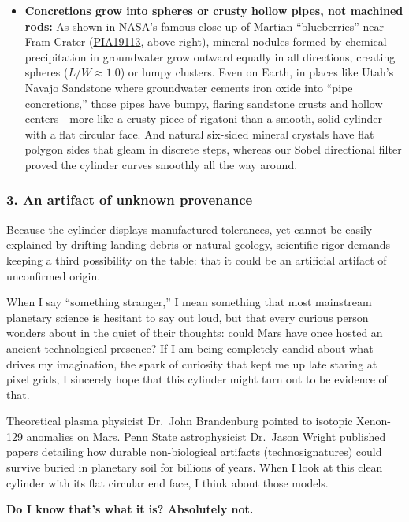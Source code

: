 \documentclass[11pt,a4paper]{article}
\begin{document}
\begin{itemize}
\begin{enumerate}
	      \end{enumerate}
	\item \textbf{Concretions grow into spheres or crusty hollow pipes, not machined rods:} As shown in NASA's famous close-up of Martian ``blueberries'' near Fram Crater (\href{https://science.nasa.gov/photojournal/martian-concretions-near-fram-crater/}{PIA19113}, above right), mineral nodules formed by chemical precipitation in groundwater grow outward equally in all directions, creating spheres ($L/W \approx 1.0$) or lumpy clusters. Even on Earth, in places like Utah's Navajo Sandstone where groundwater cements iron oxide into ``pipe concretions,'' those pipes have bumpy, flaring sandstone crusts and hollow centers---more like a crusty piece of rigatoni than a smooth, solid cylinder with a flat circular face. And natural six-sided mineral crystals have flat polygon sides that gleam in discrete steps, whereas our Sobel directional filter proved the cylinder curves smoothly all the way around.
\end{itemize}

\subsubsection*{3. An artifact of unknown provenance}
Because the cylinder displays manufactured tolerances, yet cannot be easily explained by drifting landing debris or natural geology, scientific rigor demands keeping a third possibility on the table: that it could be an artificial artifact of unconfirmed origin.

When I say ``something stranger,'' I mean something that most mainstream planetary science is hesitant to say out loud, but that every curious person wonders about in the quiet of their thoughts: could Mars have once hosted an ancient technological presence? If I am being completely candid about what drives my imagination, the spark of curiosity that kept me up late staring at pixel grids, I sincerely hope that this cylinder might turn out to be evidence of that.

Theoretical plasma physicist Dr.~John Brandenburg pointed to isotopic Xenon-129 anomalies on Mars. Penn State astrophysicist Dr.~Jason Wright published papers detailing how durable non-biological artifacts (technosignatures) could survive buried in planetary soil for billions of years. When I look at this clean cylinder with its flat circular end face, I think about those models.

\textbf{Do I know that's what it is? Absolutely not.}
\end{document}
